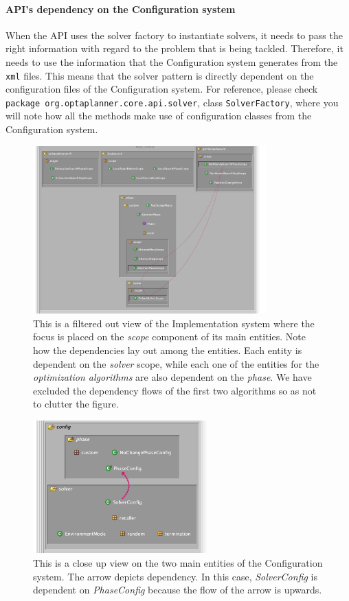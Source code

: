 \paragraph{API's dependency on the Configuration system}
When the API uses the solver factory to instantiate solvers, it needs to pass the right information with regard to the problem that is being tackled. Therefore, it needs to use the information that the Configuration system generates from the \verb!xml! files. This means that the solver pattern is directly dependent on the configuration files of the Configuration system. For reference, please check \verb!package org.optaplanner.core.api.solver!, class \verb!SolverFactory!, where you will note how all the methods make use of configuration classes from the Configuration system.
\begin{figure}
    \centering
    \includegraphics[width=0.8\textwidth]{figures/step2/scope_dep.png}
    \caption{This is a filtered out view of the Implementation system where the focus is placed on the \textit{scope} component of its main entities. Note how the dependencies lay out among the entities. Each entity is dependent on the \textit{solver} scope, while each one of the entities for the \textit{optimization algorithms} are also dependent on the \textit{phase}. We have excluded the dependency flows of the first two algorithms so as not to clutter the figure.}
   \label{fig:impl_scope}
\end{figure}
\begin{figure}
    \centering
    \includegraphics[width=0.6\textwidth]{figures/step2/dep_config.png}
    \caption{This is a close up view on the two main entities of the Configuration system. The arrow depicts dependency. In this case, \textit{SolverConfig} is dependent on \textit{PhaseConfig} because the flow of the arrow is upwards.}
    \label{fig:depend_config}
\end{figure}
